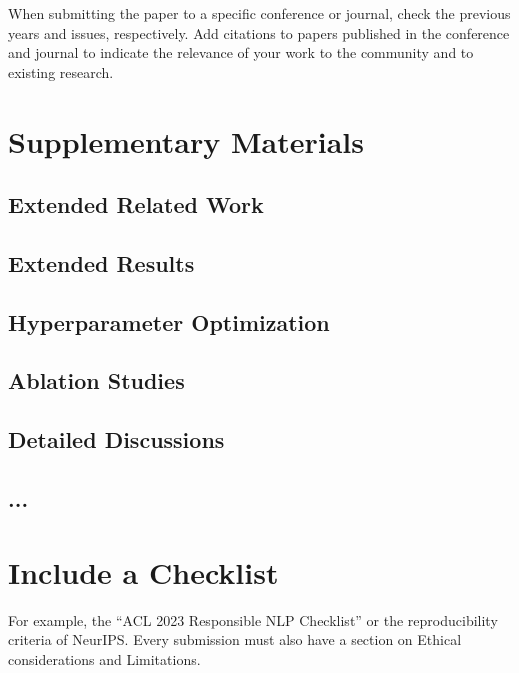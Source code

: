 \documentclass[sigconf, review, nonacm]{acmart}
\begin{document}
\begin{tcolorbox}[title=Is this paper a submission to a specific conference or journal?]
When submitting the paper to a specific conference or journal, check the previous years and issues, respectively.
Add citations to papers published in the conference and journal to indicate the relevance of your work to the community and to existing research.
\end{tcolorbox}




\newpage

\appendix

\section{Supplementary Materials}
\label{appendix:supplementarymaterials}


\subsection{Extended Related Work}
\label{appendix:extendedrelatedwork}

\subsection{Extended Results}
\label{appendix:extendedresults}

\subsection{Hyperparameter Optimization}
\label{appendix:hyperparameteroptimization}

\subsection{Ablation Studies}
\label{appendix:ablationstudies}

\subsection{Detailed Discussions}
\label{appendix:detaileddiscussion}

\subsection{...}




\section{Include a Checklist}


For example, the ``ACL 2023 Responsible NLP Checklist'' or the reproducibility criteria of NeurIPS.
Every submission must also have a section on Ethical considerations and Limitations.
\end{document}
